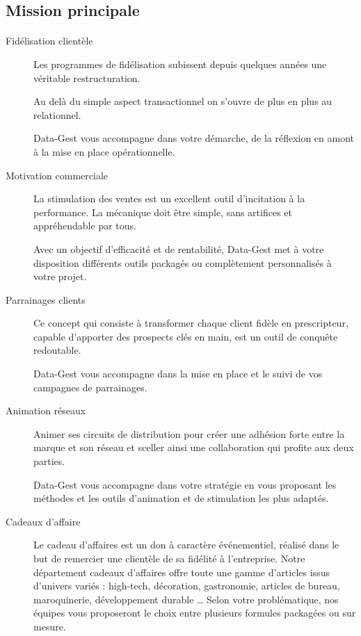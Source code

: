 \subsection{Mission principale}
\paragraph{}
\begin{description}
  \item[Fidélisation clientèle]Les programmes de fidélisation subissent depuis quelques années une véritable restructuration.

Au delà du simple aspect transactionnel on s’ouvre de plus en plus au relationnel.

Data-Gest vous accompagne dans votre démarche, de la réflexion en amont à la mise en place opérationnelle.

  \item[Motivation commerciale]La stimulation des ventes est un excellent outil d'incitation à la performance. La mécanique doit être simple, sans artifices et appréhendable par tous.

Avec un objectif d'efficacité et de rentabilité, Data-Gest met à votre disposition différents outils packagés ou complètement personnalisés à votre projet.
  \item[Parrainages clients]Ce concept qui consiste à transformer chaque client fidèle en prescripteur, capable d'apporter des prospects clés en main, est un outil de conquête redoutable.

Data-Gest vous accompagne dans la mise en place et le suivi de vos campagnes de parrainages.
  \item[Animation réseaux]Animer ses circuits de distribution pour créer une adhésion forte entre la marque et son réseau et sceller ainsi une collaboration qui profite aux deux parties.

Data-Gest vous accompagne dans votre stratégie en vous proposant les méthodes et les outils d'animation et de stimulation les plus adaptés.
  \item[Cadeaux d'affaire]
Le cadeau d'affaires est un don à caractère événementiel, réalisé dans le but de remercier une clientèle de sa fidélité à l'entreprise. Notre département cadeaux d'affaires offre toute une gamme d'articles issus d'univers variés : high-tech, décoration, gastronomie, articles de bureau, maroquinerie, développement durable …
Selon votre problématique, nos équipes vous proposeront le choix entre plusieurs formules packagées ou sur mesure. 

\end{description}



